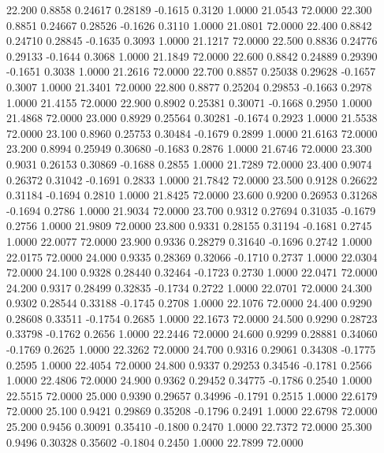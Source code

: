   22.200   0.8858   0.24617   0.28189  -0.1615   0.3120   1.0000  21.0543  72.0000
  22.300   0.8851   0.24667   0.28526  -0.1626   0.3110   1.0000  21.0801  72.0000
  22.400   0.8842   0.24710   0.28845  -0.1635   0.3093   1.0000  21.1217  72.0000
  22.500   0.8836   0.24776   0.29133  -0.1644   0.3068   1.0000  21.1849  72.0000
  22.600   0.8842   0.24889   0.29390  -0.1651   0.3038   1.0000  21.2616  72.0000
  22.700   0.8857   0.25038   0.29628  -0.1657   0.3007   1.0000  21.3401  72.0000
  22.800   0.8877   0.25204   0.29853  -0.1663   0.2978   1.0000  21.4155  72.0000
  22.900   0.8902   0.25381   0.30071  -0.1668   0.2950   1.0000  21.4868  72.0000
  23.000   0.8929   0.25564   0.30281  -0.1674   0.2923   1.0000  21.5538  72.0000
  23.100   0.8960   0.25753   0.30484  -0.1679   0.2899   1.0000  21.6163  72.0000
  23.200   0.8994   0.25949   0.30680  -0.1683   0.2876   1.0000  21.6746  72.0000
  23.300   0.9031   0.26153   0.30869  -0.1688   0.2855   1.0000  21.7289  72.0000
  23.400   0.9074   0.26372   0.31042  -0.1691   0.2833   1.0000  21.7842  72.0000
  23.500   0.9128   0.26622   0.31184  -0.1694   0.2810   1.0000  21.8425  72.0000
  23.600   0.9200   0.26953   0.31268  -0.1694   0.2786   1.0000  21.9034  72.0000
  23.700   0.9312   0.27694   0.31035  -0.1679   0.2756   1.0000  21.9809  72.0000
  23.800   0.9331   0.28155   0.31194  -0.1681   0.2745   1.0000  22.0077  72.0000
  23.900   0.9336   0.28279   0.31640  -0.1696   0.2742   1.0000  22.0175  72.0000
  24.000   0.9335   0.28369   0.32066  -0.1710   0.2737   1.0000  22.0304  72.0000
  24.100   0.9328   0.28440   0.32464  -0.1723   0.2730   1.0000  22.0471  72.0000
  24.200   0.9317   0.28499   0.32835  -0.1734   0.2722   1.0000  22.0701  72.0000
  24.300   0.9302   0.28544   0.33188  -0.1745   0.2708   1.0000  22.1076  72.0000
  24.400   0.9290   0.28608   0.33511  -0.1754   0.2685   1.0000  22.1673  72.0000
  24.500   0.9290   0.28723   0.33798  -0.1762   0.2656   1.0000  22.2446  72.0000
  24.600   0.9299   0.28881   0.34060  -0.1769   0.2625   1.0000  22.3262  72.0000
  24.700   0.9316   0.29061   0.34308  -0.1775   0.2595   1.0000  22.4054  72.0000
  24.800   0.9337   0.29253   0.34546  -0.1781   0.2566   1.0000  22.4806  72.0000
  24.900   0.9362   0.29452   0.34775  -0.1786   0.2540   1.0000  22.5515  72.0000
  25.000   0.9390   0.29657   0.34996  -0.1791   0.2515   1.0000  22.6179  72.0000
  25.100   0.9421   0.29869   0.35208  -0.1796   0.2491   1.0000  22.6798  72.0000
  25.200   0.9456   0.30091   0.35410  -0.1800   0.2470   1.0000  22.7372  72.0000
  25.300   0.9496   0.30328   0.35602  -0.1804   0.2450   1.0000  22.7899  72.0000

